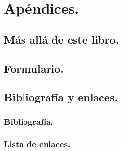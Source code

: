 \documentclass[10pt,a4paper]{book}
\begin{document}
\newpage
\part*{Apéndices.}
\appendix

\chapter{Más allá de este libro.}
\label{apendice:MasAlla}



\chapter{Formulario.}
\label{apendice:Tablas}
\newpage


%

\chapter{Bibliografía y enlaces.}\label{apendice:comentarioBibliografia}


%

\section{Bibliografía.}\label{bibliografia}


\section{Lista de enlaces.}


\backmatter

\printindex

\pagebreak
\thispagestyle{empty}
\mbox{}

\newpage
\thispagestyle{empty}
\mbox{  }
\end{document}
